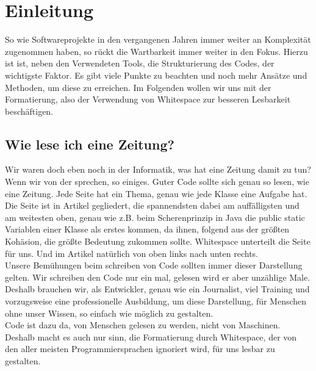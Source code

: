 \section{Einleitung}
	So wie Softwareprojekte in den vergangenen Jahren immer weiter an Komplexität zugenommen haben, so rückt die Wartbarkeit immer weiter in den Fokus.
	Hierzu ist ist, neben den Verwendeten Tools, die  Strukturierung des Codes, der wichtigste Faktor.
	Es gibt viele Punkte zu beachten und noch mehr Ansätze und Methoden, um diese zu erreichen.
	Im Folgenden wollen wir uns mit der Formatierung, also der Verwendung von Whitespace zur besseren Lesbarkeit beschäftigen.
	\subsection{Wie lese ich eine Zeitung?}
		Wir waren doch eben noch in der Informatik, was hat eine Zeitung damit zu tun?\\
		Wenn wir von der  sprechen, so einiges.
		Guter Code sollte sich genau so lesen, wie eine Zeitung.
		Jede Seite hat ein Thema, genau wie jede Klasse eine Aufgabe hat.
		Die Seite ist in Artikel gegliedert, die spannendsten dabei am auffälligsten und am weitesten oben, genau wie z.B. beim Scherenprinzip in Java die public static Variablen einer Klasse als erstes kommen, da ihnen, folgend aus der größten Kohäsion, die größte Bedeutung zukommen sollte.
		Whitespace unterteilt die Seite für uns.
		Und im Artikel natürlich von oben links nach unten rechts.\\
		Unsere Bemühungen beim schreiben von Code sollten immer dieser Darstellung gelten.
		Wir schreiben den Code nur ein mal, gelesen wird er aber unzählige Male.\\
		Deshalb brauchen wir, als Entwickler, genau wie ein Journalist, viel Training und vorzugsweise eine professionelle Ausbildung, um diese Darstellung, für Menschen ohne unser Wissen, so einfach wie möglich zu gestalten.\\
		Code ist dazu da, von Menschen gelesen zu werden, nicht von Maschinen.
		Deshalb macht es auch nur sinn, die Formatierung durch Whitespace, der von den aller meisten Programmiersprachen ignoriert wird, für uns lesbar zu gestalten.

